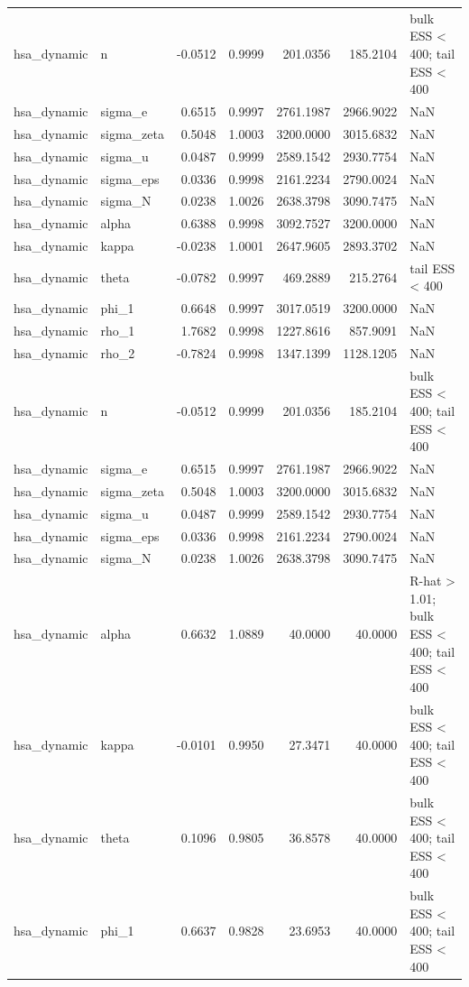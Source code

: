 \begin{tabular}{llrrrrl}
hsa\_dynamic & n & -0.0512 & 0.9999 & 201.0356 & 185.2104 & bulk ESS < 400; tail ESS < 400 \\
hsa\_dynamic & sigma\_e & 0.6515 & 0.9997 & 2761.1987 & 2966.9022 & NaN \\
hsa\_dynamic & sigma\_zeta & 0.5048 & 1.0003 & 3200.0000 & 3015.6832 & NaN \\
hsa\_dynamic & sigma\_u & 0.0487 & 0.9999 & 2589.1542 & 2930.7754 & NaN \\
hsa\_dynamic & sigma\_eps & 0.0336 & 0.9998 & 2161.2234 & 2790.0024 & NaN \\
hsa\_dynamic & sigma\_N & 0.0238 & 1.0026 & 2638.3798 & 3090.7475 & NaN \\
hsa\_dynamic & alpha & 0.6388 & 0.9998 & 3092.7527 & 3200.0000 & NaN \\
hsa\_dynamic & kappa & -0.0238 & 1.0001 & 2647.9605 & 2893.3702 & NaN \\
hsa\_dynamic & theta & -0.0782 & 0.9997 & 469.2889 & 215.2764 & tail ESS < 400 \\
hsa\_dynamic & phi\_1 & 0.6648 & 0.9997 & 3017.0519 & 3200.0000 & NaN \\
hsa\_dynamic & rho\_1 & 1.7682 & 0.9998 & 1227.8616 & 857.9091 & NaN \\
hsa\_dynamic & rho\_2 & -0.7824 & 0.9998 & 1347.1399 & 1128.1205 & NaN \\
hsa\_dynamic & n & -0.0512 & 0.9999 & 201.0356 & 185.2104 & bulk ESS < 400; tail ESS < 400 \\
hsa\_dynamic & sigma\_e & 0.6515 & 0.9997 & 2761.1987 & 2966.9022 & NaN \\
hsa\_dynamic & sigma\_zeta & 0.5048 & 1.0003 & 3200.0000 & 3015.6832 & NaN \\
hsa\_dynamic & sigma\_u & 0.0487 & 0.9999 & 2589.1542 & 2930.7754 & NaN \\
hsa\_dynamic & sigma\_eps & 0.0336 & 0.9998 & 2161.2234 & 2790.0024 & NaN \\
hsa\_dynamic & sigma\_N & 0.0238 & 1.0026 & 2638.3798 & 3090.7475 & NaN \\
hsa\_dynamic & alpha & 0.6632 & 1.0889 & 40.0000 & 40.0000 & R-hat > 1.01; bulk ESS < 400; tail ESS < 400 \\
hsa\_dynamic & kappa & -0.0101 & 0.9950 & 27.3471 & 40.0000 & bulk ESS < 400; tail ESS < 400 \\
hsa\_dynamic & theta & 0.1096 & 0.9805 & 36.8578 & 40.0000 & bulk ESS < 400; tail ESS < 400 \\
hsa\_dynamic & phi\_1 & 0.6637 & 0.9828 & 23.6953 & 40.0000 & bulk ESS < 400; tail ESS < 400 \\

\end{tabular}
